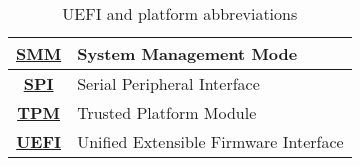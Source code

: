 \begin{table}[h]
{\begin{tabular}{|c|P{13cm}|}
\href{https://en.wikipedia.org/wiki/System_Management_Mode}{\textbf{SMM}} & System Management Mode \\   \hline
\href{https://en.wikipedia.org/wiki/Serial_Peripheral_Interface}{\textbf{SPI}} & Serial Peripheral Interface \\   \hline
\href{https://en.wikipedia.org/wiki/Trusted_Platform_Module}{\textbf{TPM}} & Trusted Platform Module \\   \hline
\href{https://www.uefi.org/}{\textbf{UEFI}} & Unified Extensible Firmware Interface \\   \hline
\end{tabular}
}
\caption{UEFI and platform abbreviations}
\end{table}
